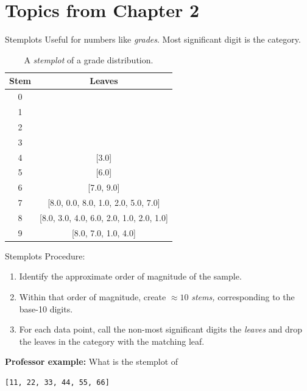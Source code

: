 \documentclass{beamer}
\begin{document}
\section{Topics from Chapter 2}

\begin{frame}[fragile]{Stemplots}
\small
Useful for numbers like \textit{grades}. Most significant digit is the category.
\begin{table}
\begin{tabular}{| c | c |}
\hline
\hline
Stem & Leaves \\ \hline
0 &   \\ \hline
1 &   \\ \hline
2 &   \\ \hline
3 &   \\ \hline
4 & [3.0] \\ \hline
5 & [6.0] \\ \hline
6 & [7.0, 9.0] \\ \hline
7 & [8.0, 0.0, 8.0, 1.0, 2.0, 5.0, 7.0] \\ \hline
8 & [8.0, 3.0, 4.0, 6.0, 2.0, 1.0, 2.0, 1.0] \\ \hline
9 & [8.0, 7.0, 1.0, 4.0] \\ \hline
\hline
\end{tabular}
\caption{A \textit{stemplot} of a grade distribution.}
\end{table}
\end{frame}

\begin{frame}[fragile]{Stemplots}
\small
Procedure:
\begin{enumerate}
\item Identify the approximate order of magnitude of the sample.
\item Within that order of magnitude, create $\approx 10$ \textit{stems,} corresponding to the base-10 digits.
\item For each data point, call the non-most significant digits the \textit{leaves} and drop the leaves in the category with the matching leaf.
\end{enumerate}
\textbf{Professor example:} What is the stemplot of 
\begin{verbatim}
[11, 22, 33, 44, 55, 66]
\end{verbatim}
\end{frame}
\end{document}
